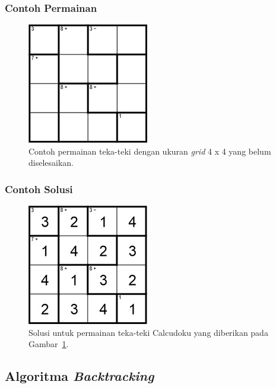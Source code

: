\documentclass{beamer}
\begin{document}
\begin{frame}
\frametitle{Contoh Permainan}
\begin{figure}
\centering
\captionsetup{justification=centering}
\includegraphics[scale=1]{Gambar/Backtracking1}
\caption[Contoh permainan teka-teki Calcudoku dengan ukuran \textit{grid} 4 x 4 yang belum diselesaikan. ]{Contoh permainan teka-teki dengan ukuran \textit{grid} 4 x 4 yang belum diselesaikan. }
\label{fig:backtracking1}
\end{figure}
\end{frame}

\begin{frame}
\frametitle{Contoh Solusi}
\begin{figure}
\centering
\captionsetup{justification=centering}
\includegraphics[scale=1]{Gambar/Backtracking2}
\caption[Solusi untuk permainan teka-teki Calcudoku yang diberikan pada Gambar~\ref{fig:backtracking1} ]{Solusi untuk permainan teka-teki Calcudoku yang diberikan pada Gambar~\ref{fig:backtracking1}. }
\label{fig:backtracking2}
\end{figure}
\end{frame}

\subsection{Algoritma \protect\textit{Backtracking}}
\end{document}
